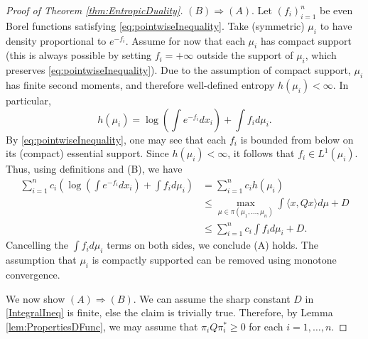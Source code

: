\documentclass[10pt]{article}
\begin{document}
\begin{proof}[Proof of Theorem \ref{thm:EntropicDuality}]
$(B) \Rightarrow (A)$. Let $(f_i)_{i=1}^n$ be even Borel functions satisfying \eqref{eq:pointwiseInequality}.  Take  (symmetric) $\mu_i$ to have density proportional to $e^{-{f_i}} $. Assume for now that each $\mu_i$ has compact support (this is always possible by setting $f_i = +\infty$ outside the support of $\mu_i$, which preserves \eqref{eq:pointwiseInequality}).  Due to the assumption of compact support, $\mu_i$ has finite second moments, and therefore well-defined entropy $h(\mu_i) < \infty$.    In particular, 
$$
h(\mu_i) =   \log \left( \int e^{-f_i} d x_i \right)  + \int  f_i d\mu_i.
$$
By \eqref{eq:pointwiseInequality}, one may see that each $f_i$ is bounded from below on its (compact) essential support.  Since $h(\mu_i)<\infty$,   it follows that $f_i  \in L^1(\mu_i)$. 
 Thus, using definitions and (B), we have 
\begin{align*}
\sum_{i=1}^n c_i \left( \log \left( \int e^{-f_i} d x_i \right)  + \int  f_i d\mu_i  \right)&=  \sum_{i=1}^n c_i h(\mu_i) \\
&\leq  \max_{\mu \in \pi(\mu_1, \dots, \mu_n)} \int \langle x, Q x\rangle d\mu  +D\\
&\leq   \sum_{i=1}^nc_i \int f_i  d\mu_i  +D.
\end{align*}
Cancelling the $\int f_i  d\mu_i$ terms on both sides, we conclude (A) holds.  The assumption that $\mu_i$ is compactly supported can be removed using monotone convergence.

 

We now show $(A) \Rightarrow (B)$.    We can assume the sharp constant $D$ in \eqref{IntegralIneq} is finite, else the claim is trivially true.  Therefore, by Lemma \ref{lem:PropertiesDFunc}, we may assume that $\pi_i Q \pi_i^* \geq 0$ for each $i=1,\dots, n$.  


\end{proof}
\end{document}
